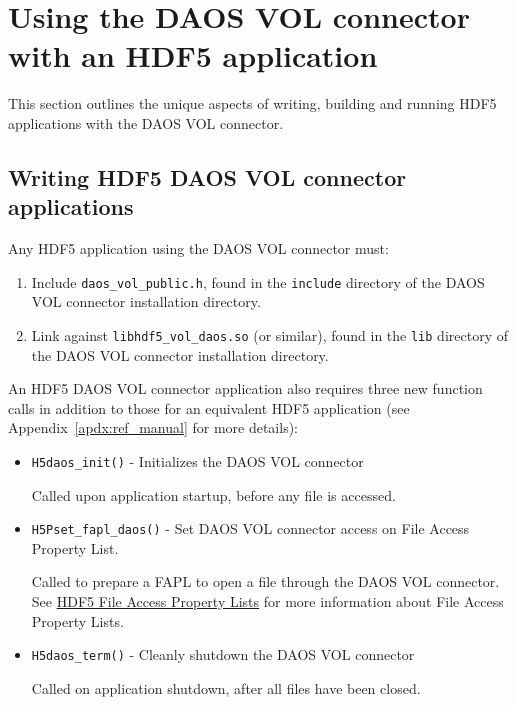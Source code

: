 
\section{Using the DAOS VOL connector with an HDF5 application}

This section outlines the unique aspects of writing, building and running HDF5 applications with the DAOS VOL connector.

\subsection{Writing HDF5 DAOS VOL connector applications}

Any HDF5 application using the DAOS VOL connector must:

\begin{enumerate}
    \item Include \texttt{daos\_vol\_public.h}, found in the \texttt{include} directory of the DAOS VOL connector installation directory.
    \item Link against \texttt{libhdf5\_vol\_daos.so} (or similar), found in the \texttt{lib} directory of the DAOS VOL connector installation directory.
\end{enumerate}

An HDF5 DAOS VOL connector application also requires three new function calls in addition to those for an equivalent HDF5 application (see Appendix~\ref{apdx:ref_manual} for more details):

\begin{itemize}
    \item \texttt{H5daos\_init()} - Initializes the DAOS VOL connector

    Called upon application startup, before any file is accessed.
    
    \item \texttt{H5Pset\_fapl\_daos()} - Set DAOS VOL connector access on File Access Property List.

    Called to prepare a FAPL to open a file through the DAOS VOL connector. See \href{https://support.hdfgroup.org/HDF5/Tutor/property.html#fa}{HDF5 File Access Property Lists} for more information about File Access Property Lists.

    \item \texttt{H5daos\_term()} - Cleanly shutdown the DAOS VOL connector

    Called on application shutdown, after all files have been closed.
\end{itemize}

